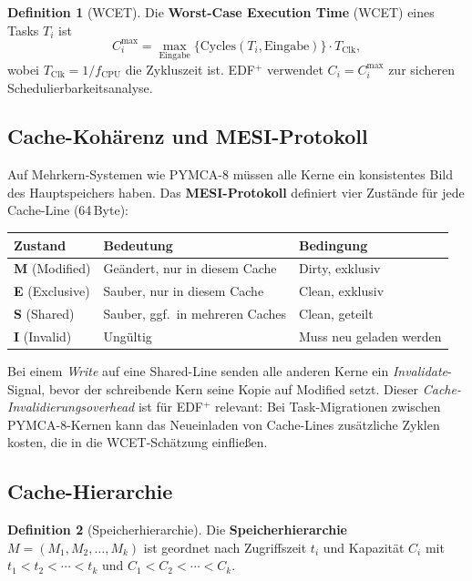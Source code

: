 ﻿\documentclass[a4paper,12pt]{scrreprt}
\theoremstyle{definition}
\newtheorem{definition}{Definition}[chapter]
\begin{document}
	\begin{definition}[WCET]
		Die \textbf{Worst-Case Execution Time} (WCET) eines Tasks $T_i$ ist
		\[
		C_i^{\max} = \max_{\text{Eingabe}} \bigl\{\text{Cycles}(T_i, \text{Eingabe})\bigr\}
		\cdot T_{\text{Clk}},
		\]
		wobei $T_{\text{Clk}} = 1/f_{\text{CPU}}$ die Zykluszeit ist. EDF$^+$
		verwendet $C_i = C_i^{\max}$ zur sicheren Schedulierbarkeitsanalyse.
	\end{definition}

	\subsection{Cache-Kohärenz und MESI-Protokoll}

	Auf Mehr\-kern-Systemen wie PYMCA-8 müssen alle Kerne ein konsistentes Bild
	des Hauptspeichers haben. Das \textbf{MESI-Protokoll} definiert vier
	Zustände für jede Cache-Line (64\,Byte):

	\begin{center}
		\begin{tabular}{lll}
			\toprule
			Zustand & Bedeutung & Bedingung \\
			\midrule
			\textbf{M} (Modified)  & Geändert, nur in diesem Cache & Dirty, exklusiv \\
			\textbf{E} (Exclusive) & Sauber, nur in diesem Cache    & Clean, exklusiv \\
			\textbf{S} (Shared)    & Sauber, ggf.\ in mehreren Caches & Clean, geteilt \\
			\textbf{I} (Invalid)   & Ungültig                        & Muss neu geladen werden \\
			\bottomrule
		\end{tabular}
	\end{center}

	Bei einem \emph{Write} auf eine Shared-Line senden alle anderen Kerne ein
	\emph{Invalidate}-Signal, bevor der schreibende Kern seine Kopie auf Modified
	setzt. Dieser \emph{Cache-Invalidierungsoverhead} ist für EDF$^+$ relevant:
	Bei Task-Migrationen zwischen PYMCA-8-Kernen kann das Neueinladen von
	Cache-Lines zusätzliche Zyklen kosten, die in die WCET-Schätzung einfließen.

	\subsection{Cache-Hierarchie}

	\begin{definition}[Speicherhierarchie]
		Die \textbf{Speicherhierarchie} $M = (M_1, M_2, \ldots, M_k)$ ist geordnet
		nach Zugriffszeit $t_i$ und Kapazität $C_i$ mit $t_1 < t_2 < \cdots < t_k$
		und $C_1 < C_2 < \cdots < C_k$.
	\end{definition}
	
\end{document}

